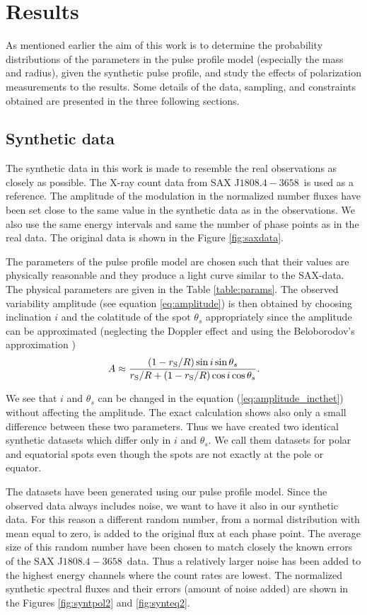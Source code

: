 \documentclass{wihuri}
\def\rg{r_{\rm S}} %
\def\be{\begin{equation}}
\def\ee{\end{equation}}
\def\rg{r_{\rm S}} %
\def\source{SAX J$1808.4-3658$}
\def\thetas{\theta_{s}}
\begin{document}
\clearpage

\section{Results}

As mentioned earlier the aim of this work is to determine the probability distributions of the parameters in the pulse profile model (especially the mass and radius), given the synthetic pulse profile, and study the effects of polarization measurements to the results. Some details of the data, sampling, and constraints obtained are presented in the three following sections. 


\subsection{Synthetic data}

The synthetic data in this work is made to resemble the real observations as closely as possible. The X-ray count data from \source \ is used as a reference. The amplitude of the modulation in the normalized number fluxes have been set close to the same value in the synthetic data as in the observations. We also use the same energy intervals and same the number of phase points as in the real data. The original data is shown in the Figure \ref{fig:saxdata}.  


The parameters of the pulse profile model are chosen such that their values are physically reasonable and they produce a light curve similar to the SAX-data. The physical parameters are given in the Table \ref{table:params}. The observed variability amplitude (see equation \ref{eq:amplitude}) is then obtained by choosing inclination $i$ and the colatitude of the spot $\thetas$ appropriately since the amplitude can be approximated (neglecting the Doppler effect and using the Beloborodov's approximation \cite{poutaviironen})
\be \label{eq:amplitude_incthet}
A \approx \frac{(1-\rg/R)\sin i \sin \thetas}{\rg/R+(1-\rg/R)\cos i \cos \thetas}.
\ee 

We see that $i$ and $\thetas$ can be changed in the equation (\ref{eq:amplitude_incthet}) without affecting the amplitude. The exact calculation shows also only a small difference between these two parameters. Thus we have created two identical synthetic datasets which differ only in $i$ and $\thetas$. We call them datasets for polar and equatorial spots even though the spots are not exactly at the pole or equator. 

The datasets have been generated using our pulse profile model. Since the observed data always includes noise, we want to have it also in our synthetic data. For this reason a different random number, from a normal distribution with mean equal to zero, is added to the original flux at each phase point. The average size of this random number have been chosen to match closely the known errors of the \source \ data. Thus a relatively larger noise has been added to the highest energy channels where the count rates are lowest. The normalized synthetic spectral fluxes and their errors (amount of noise added) are shown in the Figures \ref{fig:syntpol2} and \ref{fig:synteq2}.
\end{document}
